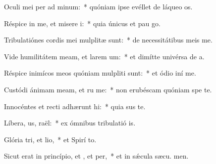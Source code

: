 \item Oculi mei per ad minum:~* quóniam ipse evéllet de láqueo  os.
\item Réspice in me, et misere i:~* quia únicus et pau  go.
\item Tribulatiónes cordis mei mulplitæ sunt:~* de necessitátibus meis  me.
\item Vide humilitátem meam, et larem um:~* et dimítte univérsa de a.
\item Réspice inimícos meos quóniam mulpliti sunt:~* et ódio iní  me.
\item Custódi ánimam meam, et ru me:~* non erubéscam quóniam spe  te.
\item Innocéntes et recti adhærunt hi:~* quia sus te.
\item Líbera, us, raël:~* ex ómnibus tribulatió is.
\item Glória tri, et lio,~* et Spirí to.
\item Sicut erat in princípio, et , et per,~* et in sǽcula sæcu. men.
